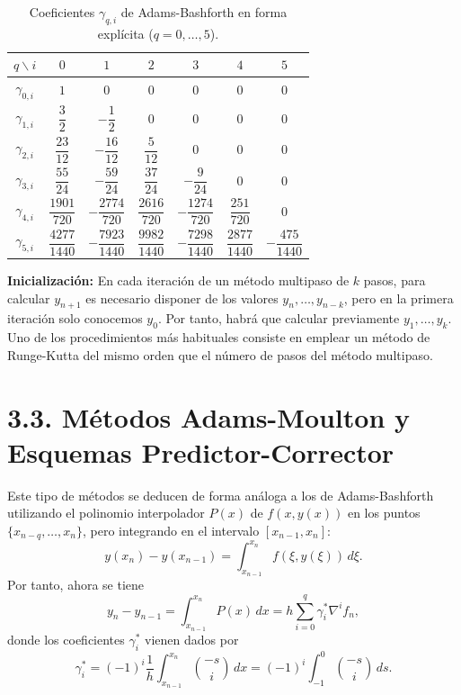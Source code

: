 \begin{table}[htbp]
    \centering
    \caption{Coeficientes $\gamma_{q,i}$ de Adams-Bashforth en forma explícita ($q = 0, \dots, 5$).}
    \label{tab:gamma_qi_ab}
    \renewcommand{\arraystretch}{1.4}
    \small
    \begin{tabular}{ccccccc}
        \toprule
        $q \backslash i$ & $0$ & $1$ & $2$ & $3$ & $4$ & $5$ \\
        \midrule
        $\gamma_{0,i}$ & $1$ & $0$ & $0$ & $0$ & $0$ & $0$ \\[0.2em]
        $\gamma_{1,i}$ & $\dfrac{3}{2}$ & $-\dfrac{1}{2}$ & $0$ & $0$ & $0$ & $0$ \\[0.4em]
        $\gamma_{2,i}$ & $\dfrac{23}{12}$ & $-\dfrac{16}{12}$ & $\dfrac{5}{12}$ & $0$ & $0$ & $0$ \\[0.4em]
        $\gamma_{3,i}$ & $\dfrac{55}{24}$ & $-\dfrac{59}{24}$ & $\dfrac{37}{24}$ & $-\dfrac{9}{24}$ & $0$ & $0$ \\[0.4em]
        $\gamma_{4,i}$ & $\dfrac{1901}{720}$ & $-\dfrac{2774}{720}$ & $\dfrac{2616}{720}$ & $-\dfrac{1274}{720}$ & $\dfrac{251}{720}$ & $0$ \\[0.4em]
        $\gamma_{5,i}$ & $\dfrac{4277}{1440}$ & $-\dfrac{7923}{1440}$ & $\dfrac{9982}{1440}$ & $-\dfrac{7298}{1440}$ & $\dfrac{2877}{1440}$ & $-\dfrac{475}{1440}$ \\
        \bottomrule
    \end{tabular}
\end{table}

\textbf{Inicialización:} En cada iteración de un método multipaso de $k$ pasos, para calcular $y_{n+1}$ es necesario disponer de los valores $y_n, \dots, y_{n-k}$, pero en la primera iteración solo conocemos $y_0$. Por tanto, habrá que calcular previamente $y_1, \dots, y_k$. Uno de los procedimientos más habituales consiste en emplear un método de Runge-Kutta del mismo orden que el número de pasos del método multipaso.

\vspace{0.3cm}

\section*{3.3. Métodos Adams-Moulton y Esquemas Predictor-Corrector}

Este tipo de métodos se deducen de forma análoga a los de Adams-Bashforth utilizando el polinomio interpolador $P(x)$ de $f(x, y(x))$ en los puntos $\{x_{n-q}, \dots, x_n\}$, pero integrando en el intervalo $[x_{n-1}, x_n]$:
\begin{equation*}
    y(x_n) - y(x_{n-1}) = \int_{x_{n-1}}^{x_n} f(\xi, y(\xi))\,d\xi.
\end{equation*}
Por tanto, ahora se tiene
\begin{equation*}
    y_n - y_{n-1} = \int_{x_{n-1}}^{x_n} P(x)\,dx = h \sum_{i=0}^{q} \gamma_i^* \nabla^i f_n,
    \tag{3.3.2}
\end{equation*}
donde los coeficientes $\gamma_i^*$ vienen dados por
\begin{equation*}
    \gamma_i^* = (-1)^i \frac{1}{h} \int_{x_{n-1}}^{x_n} \binom{-s}{i}\,dx = (-1)^i \int_{-1}^{0} \binom{-s}{i}\,ds.
\end{equation*}

